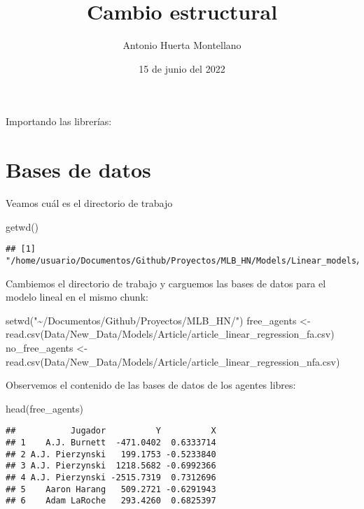 \documentclass[
]{article}
\title{Cambio estructural}
\author{Antonio Huerta Montellano}
\date{15 de junio del 2022}
\newenvironment{Shaded}{\begin{snugshade}}{\end{snugshade}}
\newcommand{\FunctionTok}[1]{\textcolor[rgb]{0.00,0.00,0.00}{#1}}
\newcommand{\NormalTok}[1]{#1}
\newcommand{\OtherTok}[1]{\textcolor[rgb]{0.56,0.35,0.01}{#1}}
\newcommand{\StringTok}[1]{\textcolor[rgb]{0.31,0.60,0.02}{#1}}
\begin{document}
\maketitle

Importando las librerías:

\section{Bases de datos}

Veamos cuál es el directorio de trabajo

\begin{Shaded}
\begin{Highlighting}[]
\FunctionTok{getwd}\NormalTok{()}
\end{Highlighting}
\end{Shaded}

\begin{verbatim}
## [1] "/home/usuario/Documentos/Github/Proyectos/MLB_HN/Models/Linear_models/Free_agent/Test"
\end{verbatim}

Cambiemos el directorio de trabajo y carguemos las bases de datos para
el modelo lineal en el mismo chunk:

\begin{Shaded}
\begin{Highlighting}[]
\FunctionTok{setwd}\NormalTok{(}\StringTok{"\textasciitilde{}/Documentos/Github/Proyectos/MLB\_HN/"}\NormalTok{)}
\NormalTok{free\_agents }\OtherTok{\textless{}{-}} \FunctionTok{read.csv}\NormalTok{(}\StringTok{\textquotesingle{}Data/New\_Data/Models/Article/article\_linear\_regression\_fa.csv\textquotesingle{}}\NormalTok{)}
\NormalTok{no\_free\_agents }\OtherTok{\textless{}{-}} \FunctionTok{read.csv}\NormalTok{(}\StringTok{\textquotesingle{}Data/New\_Data/Models/Article/article\_linear\_regression\_nfa.csv\textquotesingle{}}\NormalTok{)}
\end{Highlighting}
\end{Shaded}

Observemos el contenido de las bases de datos de los agentes libres:

\begin{Shaded}
\begin{Highlighting}[]
\FunctionTok{head}\NormalTok{(free\_agents)}
\end{Highlighting}
\end{Shaded}

\begin{verbatim}
##           Jugador          Y          X
## 1    A.J. Burnett  -471.0402  0.6333714
## 2 A.J. Pierzynski   199.1753 -0.5233840
## 3 A.J. Pierzynski  1218.5682 -0.6992366
## 4 A.J. Pierzynski -2515.7319  0.7312696
## 5    Aaron Harang   509.2721 -0.6291943
## 6    Adam LaRoche   293.4260  0.6825397
\end{verbatim}
\end{document}
